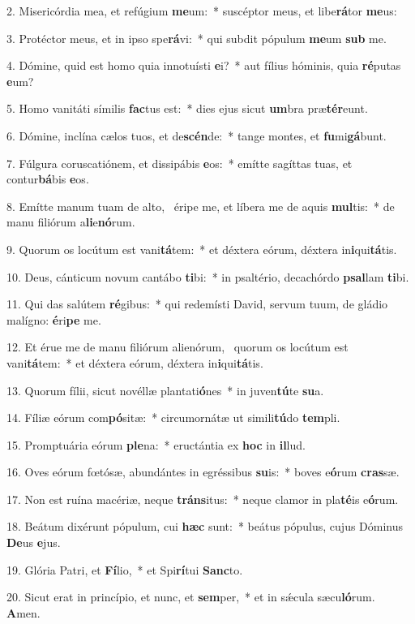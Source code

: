 2. Misericórdia mea, et refúgium \textbf{me}um:~*  suscéptor meus, et libe\textbf{rá}tor \textbf{me}us:\

3. Protéctor meus, et in ipso spe\textbf{rá}vi:~*  qui subdit pópulum \textbf{me}um \textbf{sub} me.\

4. Dómine, quid est homo quia innotuísti \textbf{e}i?~*  aut fílius hóminis, quia \textbf{ré}putas \textbf{e}um?\

5. Homo vanitáti símilis \textbf{fac}tus est:~*  dies ejus sicut \textbf{um}bra præ\textbf{tér}eunt.\

6. Dómine, inclína cælos tuos, et de\textbf{scén}de:~*  tange montes, et \textbf{fu}mi\textbf{gá}bunt.\

7. Fúlgura coruscatiónem, et dissipábis \textbf{e}os:~*  emítte sagíttas tuas, et contur\textbf{bá}bis \textbf{e}os.\

8. Emítte manum tuam de alto, \dag\  éripe me, et líbera me de aquis \textbf{mul}tis:~*  de manu filiórum a\textbf{li}e\textbf{nó}rum.\

9. Quorum os locútum est vani\textbf{tá}tem:~*  et déxtera eórum, déxtera in\textbf{i}qui\textbf{tá}tis.\

10. Deus, cánticum novum cantábo \textbf{ti}bi:~*  in psaltério, decachórdo \textbf{psal}lam \textbf{ti}bi.\

11. Qui das salútem \textbf{ré}gibus:~*  qui redemísti David, servum tuum, de gládio malígno: \textbf{é}ri\textbf{pe} me.\

12. Et érue me de manu filiórum alienórum, \dag\  quorum os locútum est vani\textbf{tá}tem:~*  et déxtera eórum, déxtera in\textbf{i}qui\textbf{tá}tis.\

13. Quorum fílii, sicut novéllæ plantati\textbf{ó}nes~*  in juven\textbf{tú}te \textbf{su}a.\

14. Fíliæ eórum com\textbf{pó}sitæ:~*  circumornátæ ut simili\textbf{tú}do \textbf{tem}pli.\

15. Promptuária eórum \textbf{ple}na:~*  eructántia ex \textbf{hoc} in \textbf{il}lud.\

16. Oves eórum fœtósæ, abundántes in egréssibus \textbf{su}is:~*  boves e\textbf{ó}rum \textbf{cras}sæ.\

17. Non est ruína macériæ, neque \textbf{tráns}itus:~*  neque clamor in pla\textbf{té}is e\textbf{ó}rum.\

18. Beátum dixérunt pópulum, cui \textbf{hæc} sunt:~*  beátus pópulus, cujus Dóminus \textbf{De}us \textbf{e}jus.\

19. Glória Patri, et \textbf{Fí}lio,~*  et Spi\textbf{rí}tui \textbf{Sanc}to.\

20. Sicut erat in princípio, et nunc, et \textbf{sem}per,~*  et in sǽcula sæcu\textbf{ló}rum. \textbf{A}men.\

